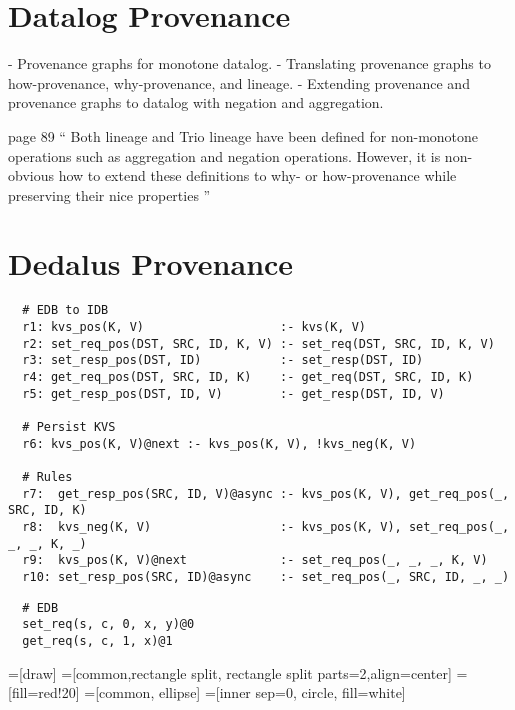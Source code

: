 \documentclass{mwhittaker}
\begin{document}
\section{Datalog Provenance}
- Provenance graphs for monotone datalog.
- Translating provenance graphs to how-provenance, why-provenance, and lineage.
- Extending provenance and provenance graphs to datalog with negation and
  aggregation.

page 89
``
Both lineage and Trio lineage have been defined for non-monotone operations
such as aggregation and negation operations. However, it is non-obvious how to
extend these definitions to why- or how-provenance while preserving their nice
properties
''

\section{Dedalus Provenance}
\begin{verbatim}
  # EDB to IDB
  r1: kvs_pos(K, V)                   :- kvs(K, V)
  r2: set_req_pos(DST, SRC, ID, K, V) :- set_req(DST, SRC, ID, K, V)
  r3: set_resp_pos(DST, ID)           :- set_resp(DST, ID)
  r4: get_req_pos(DST, SRC, ID, K)    :- get_req(DST, SRC, ID, K)
  r5: get_resp_pos(DST, ID, V)        :- get_resp(DST, ID, V)

  # Persist KVS
  r6: kvs_pos(K, V)@next :- kvs_pos(K, V), !kvs_neg(K, V)

  # Rules
  r7:  get_resp_pos(SRC, ID, V)@async :- kvs_pos(K, V), get_req_pos(_, SRC, ID, K)
  r8:  kvs_neg(K, V)                  :- kvs_pos(K, V), set_req_pos(_, _, _, K, _)
  r9:  kvs_pos(K, V)@next             :- set_req_pos(_, _, _, K, V)
  r10: set_resp_pos(SRC, ID)@async    :- set_req_pos(_, SRC, ID, _, _)
\end{verbatim}

\begin{verbatim}
  # EDB
  set_req(s, c, 0, x, y)@0
  get_req(s, c, 1, x)@1
\end{verbatim}

=[draw]
=[common,rectangle split, rectangle split parts=2,align=center]
=[fill=red!20]
=[common, ellipse]
=[inner sep=0, circle, fill=white]
\end{document}
